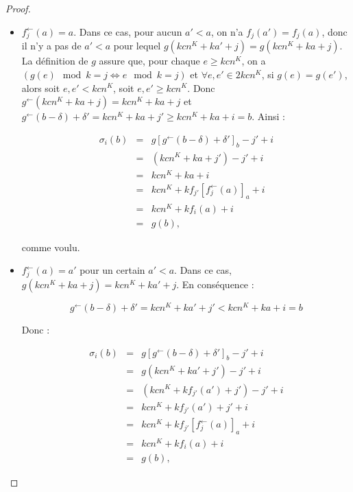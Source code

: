 \documentclass{report}
\newcommand{\eqpred}[3]{#1\left[ #2^{\leftarrow}(#3) \right]_{#3}}
\newcommand{\eqpredfi}[5]{#1\left[ #2^{\leftarrow}(#3) #4 \right]_{#5}} %
\begin{document}
\begin{proof}
\begin{enumerate}[itemsep=-1mm,leftmargin=2cm]
\begin{itemize}[itemsep=-1mm, leftmargin=1cm]
							\begin{itemize}[itemsep=-1mm,leftmargin=1cm]
								\item
									$f_j^{\leftarrow}(a) = a$.   Dans ce cas, pour aucun $a' < a$, on n'a $f_j(a') = f_j(a)$, donc il n'y a pas de $a' < a$ pour lequel $g\left( kcn^K + ka' + j \right) = g\left( kcn^K + ka + j \right)$. La définition de $g$ assure que, pour chaque $e \geqslant kcn^K$, on a $\left(g(e) \mod{k} = j \Leftrightarrow e \mod{k} = j\right)$ et $\forall e, e' \in 2kcn^K$, si $g(e) = g(e')$, alors soit $e, e' < kcn^K$, soit $e, e' \geqslant kcn^K$. Donc $g^{\leftarrow} \left( kcn^K + ka + j \right) = kcn^K + ka + j$ et $g^{\leftarrow}\left( b - \delta \right) + \delta' = kcn^K + ka + j' \geqslant kcn^K + ka + i = b$. Ainsi :
									
									\setcounter{equation}{0}
									\begin{eqnarray}
										\sigma_i(b) 	& = &	\eqpredfi{g}{g}{b-\delta}{+\delta'}{b} - j' + i \\
														& = & 	\left( kcn^K + ka + j' \right) - j' + i \\
														& = & 	kcn^K + ka + i \\
														& = & 	kcn^K + k \eqpred{f_{j'}}{f_j}{a} + i \\
														& = & 	kcn^K + k f_i(a) + i \\
														& = & 	g(b),
									\end{eqnarray}
									
									comme voulu.
									
								\item
									$f_j^{\leftarrow}(a) = a'$ pour un certain $a' < a$. Dans ce cas, $g\left( kcn^K + ka + j \right) = kcn^K + ka' + j$. En conséquence : 
									
									\[
										g^{\leftarrow}\left( b - \delta \right) + \delta' = kcn^K + ka' + j' < kcn^K + ka + i = b
									\]
									
									Donc :
									
									\setcounter{equation}{0}
									\begin{eqnarray}
										\sigma_i(b) 	& = &	\eqpredfi{g}{g}{b-\delta}{+\delta'}{b} - j' + i \\
														& = & 	g\left( kcn^K + ka' + j' \right) - j' + i \\
														& = & 	\left( kcn^K + k f_{j'}(a') + j' \right) - j' + i \\
														& = & 	kcn^K + k f_{j'}(a') + j' + i \\
														& = & 	kcn^K + k \eqpred{f_{j'}}{f_j}{a} + i \\
														& = & 	kcn^K + k f_i(a) + i \\
														& = & 	g(b),
									\end{eqnarray}
									

\end{itemize}
\end{itemize}
\end{enumerate}
\end{proof}
\end{document}
